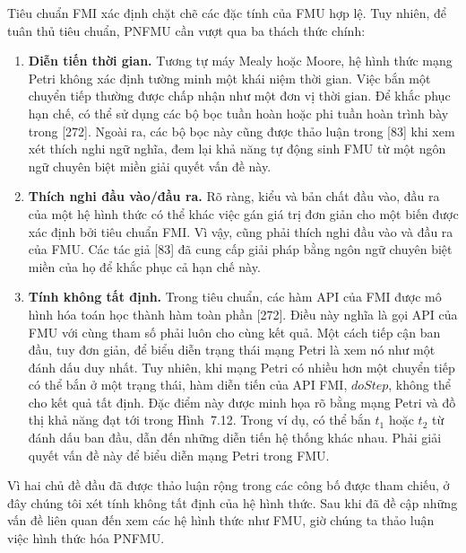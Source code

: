 Tiêu chuẩn FMI xác định chặt chẽ các đặc tính của FMU hợp lệ. Tuy nhiên, để tuân thủ tiêu chuẩn, PNFMU cần vượt qua ba thách thức chính:
\begin{enumerate}
\item \textbf{Diễn tiến thời gian.} Tương tự máy Mealy hoặc Moore, hệ hình thức mạng Petri không xác định tường minh một khái niệm thời gian. Việc bắn một chuyển tiếp thường được chấp nhận như một đơn vị thời gian. Để khắc phục hạn chế, có thể sử dụng các bộ bọc tuần hoàn hoặc phi tuần hoàn trình bày trong [272]. Ngoài ra, các bộ bọc này cũng được thảo luận trong [83] khi xem xét thích nghi ngữ nghĩa, đem lại khả năng tự động sinh FMU từ một ngôn ngữ chuyên biệt miền giải quyết vấn đề này.
\item \textbf{Thích nghi đầu vào/đầu ra.} Rõ ràng, kiểu và bản chất đầu vào, đầu ra của một hệ hình thức có thể khác việc gán giá trị đơn giản cho một biến được xác định bởi tiêu chuẩn FMI. Vì vậy, cũng phải thích nghi đầu vào và đầu ra của FMU. Các tác giả [83] đã cung cấp giải pháp bằng ngôn ngữ chuyên biệt miền của họ để khắc phục cả hạn chế này.
\item \textbf{Tính không tất định.} Trong tiêu chuẩn, các hàm API của FMI được mô hình hóa toán học thành hàm toàn phần [272]. Điều này nghĩa là gọi API của FMU với cùng tham số phải luôn cho cùng kết quả. Một cách tiếp cận ban đầu, tuy đơn giản, để biểu diễn trạng thái mạng Petri là xem nó như một đánh dấu duy nhất. Tuy nhiên, khi mạng Petri có nhiều hơn một chuyển tiếp có thể bắn ở một trạng thái, hàm diễn tiến của API FMI, $doStep$, không thể cho kết quả tất định. Đặc điểm này được minh họa rõ bằng mạng Petri và đồ thị khả năng đạt tới trong Hình~7.12. Trong ví dụ, có thể bắn $t_1$ hoặc $t_2$ từ đánh dấu ban đầu, dẫn đến những diễn tiến hệ thống khác nhau. Phải giải quyết vấn đề này để biểu diễn mạng Petri trong FMU.
\end{enumerate}

Vì hai chủ đề đầu đã được thảo luận rộng trong các công bố được tham chiếu, ở đây chúng tôi xét tính không tất định của hệ hình thức. Sau khi đã đề cập những vấn đề liên quan đến xem các hệ hình thức như FMU, giờ chúng ta thảo luận việc hình thức hóa PNFMU.



